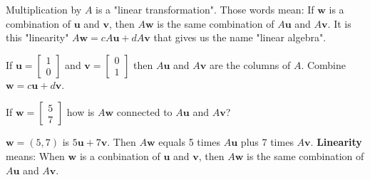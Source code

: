 \documentclass[answers]{worksheet}
\begin{document}
\begin{question}
Multiplication by $A$ is a "linear transformation". Those words mean: 
If $\boldsymbol{w}$ is a combination of $\boldsymbol{u}$ and $\boldsymbol{v}$, then $A\boldsymbol{w}$ is the same combination of $A\boldsymbol{u}$ and $A\boldsymbol{v}$. 
It is this "linearity" $A\boldsymbol{w}=cA\boldsymbol{u}+dA\boldsymbol{v}$ that gives us the name "linear algebra".

If $\boldsymbol{u}=\begin{bmatrix}1\\0 \end{bmatrix}$ and $\boldsymbol{v}=\begin{bmatrix} 0\\1 \end{bmatrix}$ then $A\boldsymbol{u}$ and $A\boldsymbol{v}$ are 
the columns of $A$. Combine $\boldsymbol{w}=c\boldsymbol{u}+d\boldsymbol{v}$. 

If $\boldsymbol{w}=\begin{bmatrix} 5\\7 \end{bmatrix}$ how is $A\boldsymbol{w}$ connected to 
$A\boldsymbol{u}$ and $A\boldsymbol{v}$?

\blankspace{15em}
\end{question}

\begin{answer}
    $\boldsymbol{w}=(5,7)$ is $5\boldsymbol{u} + 7 \boldsymbol{v}$. Then $A\boldsymbol{w}$ equals 5 times $A\boldsymbol{u}$ plus 7 times $A\boldsymbol{v}$. 
    \textbf{Linearity} means: When $\boldsymbol{w}$ is a conbination of $\boldsymbol{u}$ and $\boldsymbol{v}$, then $A\boldsymbol{w}$ is the same combination of $A\boldsymbol{u}$ and $A\boldsymbol{v}$.
\end{answer}
\end{document}
